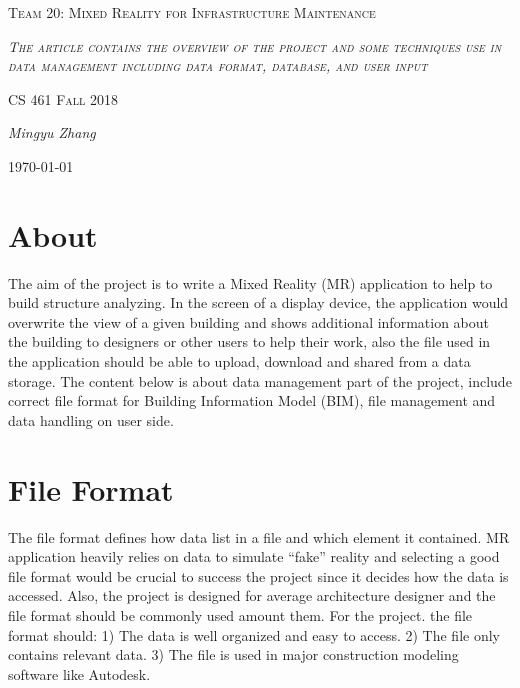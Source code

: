 \documentclass[10pt,letter paper]{article}
\begin{document}
\begin{titlepage}
	\centering
	\vspace{8cm}
	{\scshape\huge Team 20: Mixed Reality for Infrastructure Maintenance \par}
	\vspace{2cm}
	{\scshape\itshape The article contains the overview of the project and some techniques use in data management including data format, database, and user input\par}
	\vspace{1.5cm}
	{\scshape\Large CS 461 Fall 2018\par}
	\vspace{1.5cm}
	{\Large\itshape Mingyu Zhang\par}
	\vspace{1.5cm}


	{\large \today\par}
\end{titlepage}

\section*{About }
The aim of the project is to write a Mixed Reality (MR) application to help to build structure analyzing. In the screen of a display device, the application would overwrite the view of a given building and shows additional information about the building to designers or other users to help their work, also the file used in the application should be able to upload, download and shared from a data storage. \newline
\noindent
\newline
The content below is about data management part of the project, include correct file format for Building Information Model (BIM), file management and data handling on user side.

\section{File Format}
The file format defines how data list in a file and which element it contained.  MR application heavily relies on data to simulate “fake” reality and selecting a good file format would be crucial to success the project since it decides how the data is accessed. Also, the project is designed for average architecture designer and the file format should be commonly used amount them. \newline
\noindent
\newline
For the project. the file format should: 1) The data is well organized and easy to access. 2) The file only contains relevant data. 3) The file is used in major construction modeling software like Autodesk.
\end{document}
